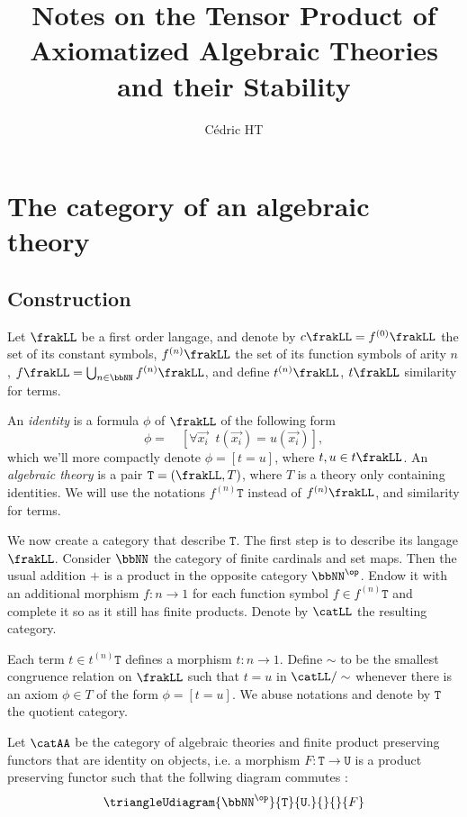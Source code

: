 \documentclass[a4paper, 12pt]{article}
\title{Notes on the Tensor Product of Axiomatized Algebraic Theories and their Stability}
\author{Cédric HT}
\date{}
\newcommand{\theory}{\mathtt}
\begin{document}
\maketitle

\tableofcontents

\section{The category of an algebraic theory}

\subsection{Construction}

Let $\frakLL$ be a first order langage, and denote by $c\frakLL = f^{(0)} \frakLL$ the set of its constant symbols, $f^{(n)} \frakLL$ the set of its function symbols of arity $n$, $f \frakLL = \bigcup_{n \in \bbNN} f^{(n)} \frakLL$, and define $t^{(n)} \frakLL$, $t \frakLL$ similarity for terms.

An \emph{identity} is a formula $\phi$ of $\frakLL$ of the following form
\[ \phi = \quad [\forall \overrightarrow{x_i} \;\; t(\overrightarrow{x_i}) = u(\overrightarrow{x_i})] , \]
which we'll more compactly denote $\phi = [t = u]$, where $t, u \in t \frakLL$. An \emph{algebraic theory} is a pair $\theory{T} = (\frakLL, T)$, where $T$ is a theory only containing identities. We will use the notations $f^{(n)} \theory{T}$ instead of $f^{(n)} \frakLL$, and similarity for terms.

We now create a category that describe $\theory{T}$. The first step is to describe its langage $\frakLL$. Consider $\bbNN$ the category of finite cardinals and set maps. Then the usual addition $+$ is a product in the opposite category $\bbNN^\op$. Endow it with an additional morphism $f : n \longrightarrow 1$ for each function symbol $f \in f^{(n)} \theory{T}$ and complete it so as it still has finite products. Denote by $\catLL$ the resulting category.

Each term $t \in t^{(n)} \theory{T}$ defines a morphism $t : n \longrightarrow 1$. Define $\sim$ to be the smallest congruence relation on $\frakLL$ such that $t = u$ in $\catLL / \sim$ whenever there is an axiom $\phi \in T$ of the form $\phi = [t = u]$. We abuse notations and denote by $\theory{T}$ the quotient category.

Let $\catAA$ be the category of algebraic theories and finite product preserving functors that are identity on objects, i.e. a morphism $F : \theory{T} \longrightarrow \theory{U}$ is a product preserving functor such that the follwing diagram commutes : 
\[ \triangleUdiagram{\bbNN^\op}{\theory{T}}{\theory{U} .}{}{}{F} \]
\end{document}
